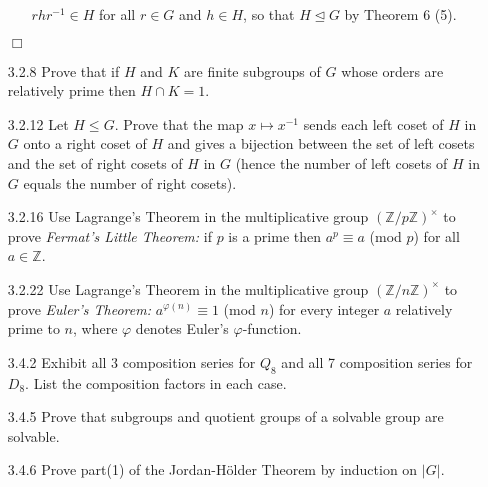 \documentclass[9pt]{article}
\newcommand{\qed}{\hfill \ensuremath{\Box}}
\newcommand{\Z}{\mathbb{Z}}
\begin{document}
\begin{enumerate}
\begin{enumerate}
               $rhr^{-1} \in H$ for all $r \in G$ and $h \in H$, so that
               $H \trianglelefteq G$ by Theorem 6 (5).
      \end{enumerate}
      \qed
   \item[3.2.8]   Prove that if $H$ and $K$ are finite subgroups of $G$ whose
                  orders are relatively prime then $H \cap K = 1$.      
   \item[3.2.12]  Let $H \le G$. Prove that the map $x \mapsto x^{-1}$ sends
                  each left coset of $H$ in $G$ onto a right coset of $H$ and
                  gives a bijection between the set of left cosets and the set
                  of right cosets of $H$ in $G$ (hence the number of left cosets
                  of $H$ in $G$ equals the number of right cosets).
   \item[3.2.16]  Use Lagrange's Theorem in the multiplicative group
                  $(\Z/p\Z)^\times$ to prove \textit{Fermat's Little Theorem: }
                  if $p$ is a prime then $a^p \equiv a$ (mod $p$) for all
                  $a \in \Z$.
   \item[3.2.22]  Use Lagrange's Theorem in the multiplicative group
                  $(\Z/n\Z)^\times$ to prove \textit{Euler's Theorem: }
                  $a^{\varphi(n)} \equiv 1$ (mod $n$) for every integer $a$
                  relatively prime to $n$, where $\varphi$ denotes Euler's
                  $\varphi$-function.
   \item[3.4.2]   Exhibit all 3 composition series for $Q_8$ and all 7 
                  composition series for $D_8$. List the composition factors in
                  each case.
   \item[3.4.5]   Prove that subgroups and quotient groups of a solvable group
                  are solvable.
   \item[3.4.6]   Prove part(1) of the Jordan-H\"{o}lder Theorem by induction on
                  $|G|$.
\end{enumerate}
\end{document}
